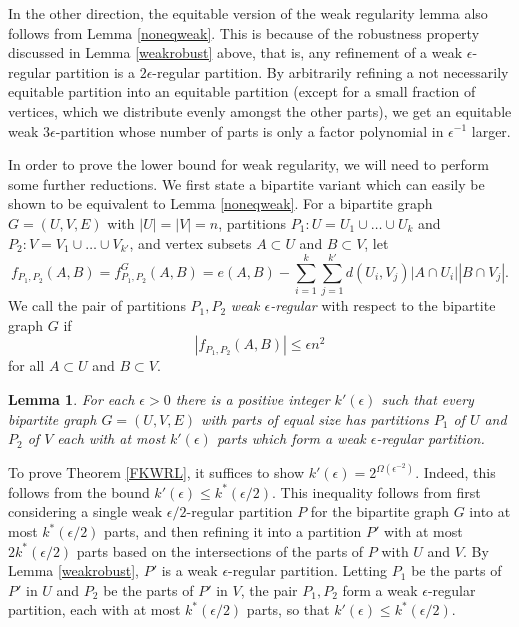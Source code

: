 \documentclass[11pt]{article}
\newtheorem{lemma}{Lemma}[section]
\begin{document}
In the other direction, the equitable version of the weak regularity lemma also follows from Lemma \ref{noneqweak}. This is because of the robustness property discussed in Lemma \ref{weakrobust} above, that is, any refinement of a weak $\epsilon$-regular partition is a $2\epsilon$-regular partition. By arbitrarily refining a not necessarily equitable partition into an equitable partition (except for a small fraction of vertices, which we distribute evenly amongst the other parts), we get an equitable weak $3 \epsilon$-partition whose number of parts is only a factor polynomial in $\epsilon^{-1}$ larger.

In order to prove the lower bound for weak regularity, we will need to perform some further reductions. We first state a bipartite variant which can easily be shown to be equivalent to Lemma \ref{noneqweak}. For a bipartite graph $G=(U,V,E)$ with $|U|=|V|=n$, partitions
$P_1:U=U_1 \cup \ldots \cup U_k$ and $P_2:V=V_1 \cup \ldots \cup V_{k'}$, and
vertex subsets $A \subset U$ and $B \subset V$, let
$$f_{P_1,P_2}(A,B)=f_{P_1,P_2}^G(A,B)=e(A,B)-\sum_{i=1}^k \sum_{j=1}^{k'}
d(U_i,V_j)|A \cap U_i| |B \cap V_j|.$$ We call the pair of partitions $P_1,P_2$
{\it weak $\epsilon$-regular} with respect to the bipartite graph $G$ if
$$|f_{P_1,P_2}(A,B)| \leq \epsilon n^2$$ for all $A \subset U$ and $B \subset
V$.

\begin{lemma}\label{brl}
For each $\epsilon>0$ there is a positive integer $k'(\epsilon)$ such that
every bipartite graph $G=(U,V,E)$ with parts of equal size has partitions $P_1$
of $U$ and $P_2$ of $V$ each with at most $k'(\epsilon)$ parts
which form a weak $\epsilon$-regular partition.
\end{lemma}

To prove Theorem \ref{FKWRL}, it suffices to show
$k'(\epsilon)=2^{\Omega(\epsilon^{-2})}$. Indeed, this follows from the bound
$k'(\epsilon) \leq k^*(\epsilon/2)$. This inequality follows from first
considering a single weak $\epsilon/2$-regular partition $P$ for the bipartite
graph $G$ into at most $k^*(\epsilon/2)$ parts, and then refining it into a
partition $P'$ with at most $2k^*(\epsilon/2)$ parts based on the intersections
of the parts of $P$ with $U$ and $V$.  By Lemma \ref{weakrobust}, $P'$ is a
weak $\epsilon$-regular partition. Letting $P_1$ be the parts of $P'$ in $U$
and $P_2$ be the parts of $P'$ in $V$, the pair $P_1,P_2$ form a weak
$\epsilon$-regular partition, each with at most $k^*(\epsilon/2)$ parts, so that
$k'(\epsilon) \leq k^*(\epsilon/2)$.
\end{document}
